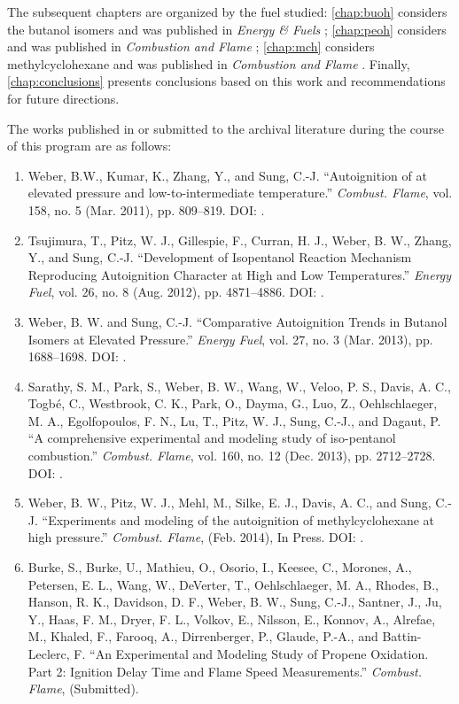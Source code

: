 \documentclass[../main.tex]{subfiles}
\begin{document}
The subsequent chapters are organized by the fuel studied:
\cref{chap:buoh} considers the butanol isomers and was published in
\textit{Energy \& Fuels} \cite{Weber2013}; \cref{chap:peoh} considers
\iPeOH{} and was published in \textit{Combustion and Flame}
\cite{Sarathy2013}; \cref{chap:mch} considers methylcyclohexane and was
published in \textit{Combustion and Flame} \cite{Weber2014}. Finally,
\cref{chap:conclusions} presents conclusions based on this work and
recommendations for future directions.

The works published in or submitted to the archival literature during the
course of this program are as follows:
\begin{enumerate}
\item[] Weber, B.W., Kumar, K., Zhang, Y., and Sung, C.-J.
        ``Autoignition of \nBuOH{} at elevated pressure and
        low-to-intermediate temperature.'' \textit{Combust. Flame},
        vol. 158, no. 5 (Mar. 2011), pp. 809--819.
        DOI: .
\item[] Tsujimura, T., Pitz, W. J., Gillespie, F., Curran, H. J., Weber,
        B. W., Zhang, Y., and Sung, C.-J. ``Development of Isopentanol
        Reaction Mechanism Reproducing Autoignition Character at High
        and Low Temperatures.'' \textit{Energy Fuel}, vol. 26, no. 8
        (Aug. 2012), pp. 4871--4886. DOI: .
\item[] Weber, B. W. and Sung, C.-J. ``Comparative Autoignition Trends
        in Butanol Isomers at Elevated Pressure.'' \textit{Energy Fuel},
        vol. 27, no. 3 (Mar. 2013), pp. 1688--1698.
        DOI: .
\item[] Sarathy, S. M., Park, S., Weber, B. W., Wang, W., Veloo, P. S.,
        Davis, A. C., Togbé, C., Westbrook, C. K., Park, O., Dayma, G.,
        Luo, Z., Oehlschlaeger, M. A., Egolfopoulos, F. N., Lu, T.,
        Pitz, W. J., Sung, C.-J., and Dagaut, P. ``A comprehensive
        experimental and modeling study of iso-pentanol combustion.''
        \textit{Combust. Flame}, vol. 160, no. 12 (Dec. 2013),
        pp. 2712--2728. DOI: .
\item[] Weber, B. W., Pitz, W. J., Mehl, M., Silke, E. J., Davis, A. C.,
        and Sung, C.-J. ``Experiments and modeling of the autoignition
        of methylcyclohexane at high pressure.'' \textit{Combust. Flame},
        (Feb. 2014), In Press.
        DOI: .
\item[] Burke, S., Burke, U., Mathieu, O., Osorio, I., Keesee, C.,
        Morones, A., Petersen, E. L., Wang, W., DeVerter, T.,
        Oehlschlaeger, M. A., Rhodes, B., Hanson, R. K., Davidson, D. F.,
        Weber, B. W., Sung, C.-J., Santner, J., Ju, Y., Haas, F. M.,
        Dryer, F. L., Volkov, E., Nilsson, E., Konnov, A., Alrefae, M.,
        Khaled, F., Farooq, A., Dirrenberger, P., Glaude, P.-A., and
        Battin-Leclerc, F. ``An Experimental and Modeling Study of
        Propene Oxidation. Part 2: Ignition Delay Time and Flame Speed
        Measurements.'' \textit{Combust. Flame}, (Submitted).
\end{enumerate}
\end{document}

